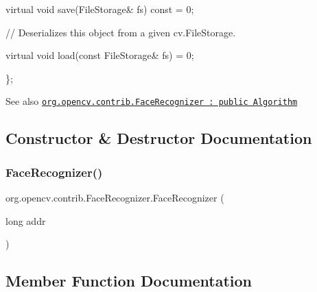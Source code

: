 {\ttfamily }

{\ttfamily }

{\ttfamily virtual void save(\+File\+Storage\& fs) const = 0;}

{\ttfamily }

{\ttfamily }

{\ttfamily // Deserializes this object from a given cv.\+File\+Storage.}

{\ttfamily }

{\ttfamily }

{\ttfamily virtual void load(const File\+Storage\& fs) = 0;}

{\ttfamily }

{\ttfamily }

{\ttfamily \};}

{\ttfamily }

{\ttfamily \begin{DoxySeeAlso}{See also}
\href{http://docs.opencv.org/modules/contrib/doc/facerec_api.html#facerecognizer}{\tt org.\+opencv.\+contrib.\+Face\+Recognizer \+: public Algorithm} 
\end{DoxySeeAlso}
}

\subsection{Constructor \& Destructor Documentation}
\mbox{\label{classorg_1_1opencv_1_1contrib_1_1_face_recognizer_a697f676af90ddfdcbe27bae82fb201be}} 
\subsubsection{\texorpdfstring{Face\+Recognizer()}{FaceRecognizer()}}
{\footnotesize\ttfamily org.\+opencv.\+contrib.\+Face\+Recognizer.\+Face\+Recognizer (\begin{DoxyParamCaption}\item[{long}]{addr }\end{DoxyParamCaption})\hspace{0.3cm}{\ttfamily [protected]}}



\subsection{Member Function Documentation}
\mbox{\label{classorg_1_1opencv_1_1contrib_1_1_face_recognizer_ae4529f57531f3d3f91dafa7f82e9418d}} 
